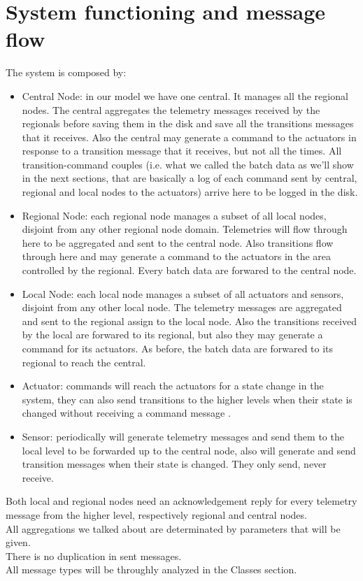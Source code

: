 \documentclass[11pt]{article}
\begin{document}
\section{System functioning and message flow}
The system is composed by:
\begin{itemize}
    \item Central Node: in our model we have one central. It manages all the regional nodes. The central aggregates the telemetry messages received by the regionals before saving them in the disk and save all the transitions messages that it receives. Also the central may generate a command to the actuators in response to a transition message that it receives, but not all the times. All transition-command couples (i.e. what we called the batch data as we'll show in the next sections, that are basically a log of each command sent by central, regional and local nodes to the actuators) arrive here to be logged in the disk.
\item Regional Node: each regional node manages a subset of all local nodes, disjoint from any other regional node domain. Telemetries will flow through here to be aggregated and sent to the central node. Also transitions flow through here and may generate a command to the actuators in the area controlled by the regional. Every batch data are forwared to the central node.  
\item Local Node: each local node manages a subset of all actuators and sensors, disjoint from any other local node. The telemetry messages are aggregated and sent to the regional assign to the local node. Also the transitions received by the local are forwared to its regional, but also they may generate a command for its actuators. As before, the batch data are forwared to its regional to reach the central.  
\item Actuator: commands will reach the actuators for a state change in the system, they can also send transitions to the higher levels when their state is changed without receiving a command message .
\item Sensor: periodically will generate telemetry messages and send them to the local level to be forwarded up to the central node, also will generate and send transition messages when their state is changed. They only send, never receive.
\end{itemize}
Both local and regional nodes need an acknowledgement reply for every telemetry message from the higher level, respectively regional and central nodes. \\
All aggregations we talked about are determinated by parameters that will be given.\\
There is no duplication in sent messages.\\
All message types will be throughly analyzed in the Classes section.\\
\end{document}
